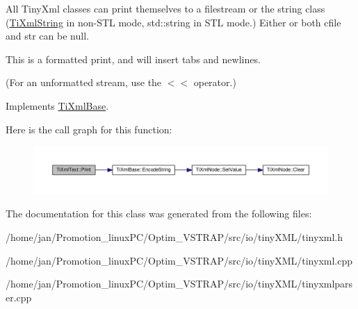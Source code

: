 All Tiny\+Xml classes can print themselves to a filestream or the string class (\hyperlink{classTiXmlString}{Ti\+Xml\+String} in non-\/\+S\+TL mode, std\+::string in S\+TL mode.) Either or both cfile and str can be null.

This is a formatted print, and will insert tabs and newlines.

(For an unformatted stream, use the $<$$<$ operator.) 

Implements \hyperlink{classTiXmlBase_a0de56b3f2ef14c65091a3b916437b512}{Ti\+Xml\+Base}.

Here is the call graph for this function\+:
\nopagebreak
\begin{figure}[H]
\begin{center}
\leavevmode
\includegraphics[width=350pt]{classTiXmlText_a75f6895906333894e2574cc8cf77ea79_cgraph}
\end{center}
\end{figure}


The documentation for this class was generated from the following files\+:\begin{DoxyCompactItemize}
\item 
/home/jan/\+Promotion\+\_\+linux\+P\+C/\+Optim\+\_\+\+V\+S\+T\+R\+A\+P/src/io/tiny\+X\+M\+L/tinyxml.\+h\item 
/home/jan/\+Promotion\+\_\+linux\+P\+C/\+Optim\+\_\+\+V\+S\+T\+R\+A\+P/src/io/tiny\+X\+M\+L/tinyxml.\+cpp\item 
/home/jan/\+Promotion\+\_\+linux\+P\+C/\+Optim\+\_\+\+V\+S\+T\+R\+A\+P/src/io/tiny\+X\+M\+L/tinyxmlparser.\+cpp\end{DoxyCompactItemize}
